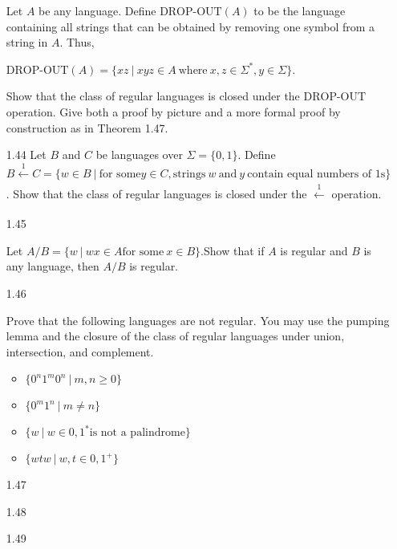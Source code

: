 \begin{enumerate}
            Let $A$ be any language. Define $\text{DROP-OUT}(A)$ to be the language containing all strings that can be obtained by removing one symbol from a string in $A$. Thus,

            $\text{DROP-OUT}(A)=\{xz ~|~ xyz \in A~ \text{where}~ x,z \in \Sigma^\ast,y \in \Sigma\}$.

            Show that the class of regular languages is closed under the $\text{DROP-OUT}$ operation. Give both a proof by picture and a more formal proof by construction as in Theorem 1.47.




      \item [1.44]
      Let $B$ and $C$ be languages over $\Sigma = \{0,1\}$. Define $B \xleftarrow[]{1} C = \{w \in B~| ~\text{for some} y \in C, \text{strings}~ w~ \text{and}~ y~ \text{contain equal numbers of }1\text{s}\}$. Show that the class of regular languages is closed under the $\xleftarrow[]{1}$ operation.   

      \item [1.45]

      Let $A/B = \{w~|~wx \in A \text{for some}~ x \in B\}$.Show that if $A$ is regular and $B$ is any language, then $A/B$ is regular.
      \item [1.46]
      
      Prove that the following languages are not regular. You may use the pumping lemma and the closure of the class of regular languages under union, intersection, and complement. 

    \begin{itemize}

      \item $\{0^n1^m0^n ~|~ m,n \ge 0\}$ 

      \item $\{0^m1^n~ |~ m \ne n\} $

      \item $\{w~|~w \in {0,1}^\ast \text{is not a palindrome}\}$

      \item $\{wtw~|~w,t \in{0,1}^+\}$

    \end{itemize}
      \item [1.47]
      \item [1.48]
      \item [1.49]


\end{enumerate}
